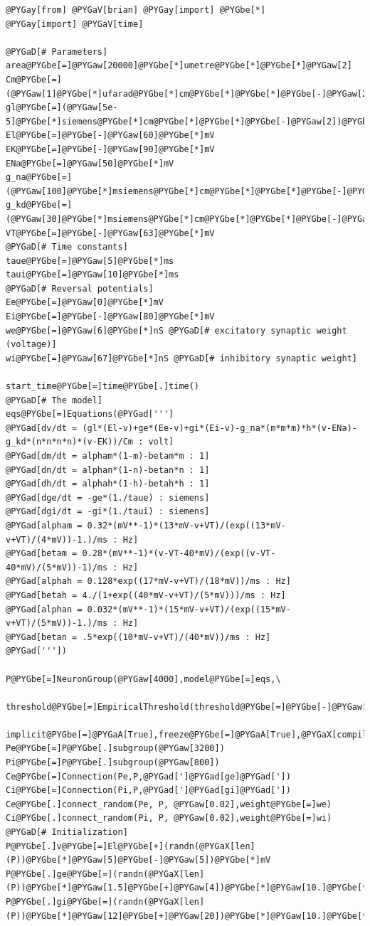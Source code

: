 \documentclass[letterpaper,10pt]{manual}
\begin{document}
\begin{Verbatim}[commandchars=@\[\]]
@PYGay[from] @PYGaV[brian] @PYGay[import] @PYGbe[*]
@PYGay[import] @PYGaV[time]

@PYGaD[# Parameters]
area@PYGbe[=]@PYGaw[20000]@PYGbe[*]umetre@PYGbe[*]@PYGbe[*]@PYGaw[2]
Cm@PYGbe[=](@PYGaw[1]@PYGbe[*]ufarad@PYGbe[*]cm@PYGbe[*]@PYGbe[*]@PYGbe[-]@PYGaw[2])@PYGbe[*]area
gl@PYGbe[=](@PYGaw[5e-5]@PYGbe[*]siemens@PYGbe[*]cm@PYGbe[*]@PYGbe[*]@PYGbe[-]@PYGaw[2])@PYGbe[*]area
El@PYGbe[=]@PYGbe[-]@PYGaw[60]@PYGbe[*]mV
EK@PYGbe[=]@PYGbe[-]@PYGaw[90]@PYGbe[*]mV
ENa@PYGbe[=]@PYGaw[50]@PYGbe[*]mV
g_na@PYGbe[=](@PYGaw[100]@PYGbe[*]msiemens@PYGbe[*]cm@PYGbe[*]@PYGbe[*]@PYGbe[-]@PYGaw[2])@PYGbe[*]area
g_kd@PYGbe[=](@PYGaw[30]@PYGbe[*]msiemens@PYGbe[*]cm@PYGbe[*]@PYGbe[*]@PYGbe[-]@PYGaw[2])@PYGbe[*]area
VT@PYGbe[=]@PYGbe[-]@PYGaw[63]@PYGbe[*]mV
@PYGaD[# Time constants]
taue@PYGbe[=]@PYGaw[5]@PYGbe[*]ms
taui@PYGbe[=]@PYGaw[10]@PYGbe[*]ms
@PYGaD[# Reversal potentials]
Ee@PYGbe[=]@PYGaw[0]@PYGbe[*]mV
Ei@PYGbe[=]@PYGbe[-]@PYGaw[80]@PYGbe[*]mV
we@PYGbe[=]@PYGaw[6]@PYGbe[*]nS @PYGaD[# excitatory synaptic weight (voltage)]
wi@PYGbe[=]@PYGaw[67]@PYGbe[*]nS @PYGaD[# inhibitory synaptic weight]

start_time@PYGbe[=]time@PYGbe[.]time()
@PYGaD[# The model]
eqs@PYGbe[=]Equations(@PYGad[''']
@PYGad[dv/dt = (gl*(El-v)+ge*(Ee-v)+gi*(Ei-v)-g_na*(m*m*m)*h*(v-ENa)-g_kd*(n*n*n*n)*(v-EK))/Cm : volt]
@PYGad[dm/dt = alpham*(1-m)-betam*m : 1]
@PYGad[dn/dt = alphan*(1-n)-betan*n : 1]
@PYGad[dh/dt = alphah*(1-h)-betah*h : 1]
@PYGad[dge/dt = -ge*(1./taue) : siemens]
@PYGad[dgi/dt = -gi*(1./taui) : siemens]
@PYGad[alpham = 0.32*(mV**-1)*(13*mV-v+VT)/(exp((13*mV-v+VT)/(4*mV))-1.)/ms : Hz]
@PYGad[betam = 0.28*(mV**-1)*(v-VT-40*mV)/(exp((v-VT-40*mV)/(5*mV))-1)/ms : Hz]
@PYGad[alphah = 0.128*exp((17*mV-v+VT)/(18*mV))/ms : Hz]
@PYGad[betah = 4./(1+exp((40*mV-v+VT)/(5*mV)))/ms : Hz]
@PYGad[alphan = 0.032*(mV**-1)*(15*mV-v+VT)/(exp((15*mV-v+VT)/(5*mV))-1.)/ms : Hz]
@PYGad[betan = .5*exp((10*mV-v+VT)/(40*mV))/ms : Hz]
@PYGad['''])

P@PYGbe[=]NeuronGroup(@PYGaw[4000],model@PYGbe[=]eqs,\
              threshold@PYGbe[=]EmpiricalThreshold(threshold@PYGbe[=]@PYGbe[-]@PYGaw[20]@PYGbe[*]mV,refractory@PYGbe[=]@PYGaw[3]@PYGbe[*]ms),\
              implicit@PYGbe[=]@PYGaA[True],freeze@PYGbe[=]@PYGaA[True],@PYGaX[compile]@PYGbe[=]@PYGaA[False])
Pe@PYGbe[=]P@PYGbe[.]subgroup(@PYGaw[3200])
Pi@PYGbe[=]P@PYGbe[.]subgroup(@PYGaw[800])
Ce@PYGbe[=]Connection(Pe,P,@PYGad[']@PYGad[ge]@PYGad['])
Ci@PYGbe[=]Connection(Pi,P,@PYGad[']@PYGad[gi]@PYGad['])
Ce@PYGbe[.]connect_random(Pe, P, @PYGaw[0.02],weight@PYGbe[=]we)
Ci@PYGbe[.]connect_random(Pi, P, @PYGaw[0.02],weight@PYGbe[=]wi)
@PYGaD[# Initialization]
P@PYGbe[.]v@PYGbe[=]El@PYGbe[+](randn(@PYGaX[len](P))@PYGbe[*]@PYGaw[5]@PYGbe[-]@PYGaw[5])@PYGbe[*]mV
P@PYGbe[.]ge@PYGbe[=](randn(@PYGaX[len](P))@PYGbe[*]@PYGaw[1.5]@PYGbe[+]@PYGaw[4])@PYGbe[*]@PYGaw[10.]@PYGbe[*]nS
P@PYGbe[.]gi@PYGbe[=](randn(@PYGaX[len](P))@PYGbe[*]@PYGaw[12]@PYGbe[+]@PYGaw[20])@PYGbe[*]@PYGaw[10.]@PYGbe[*]nS


\end{Verbatim}
\end{document}
